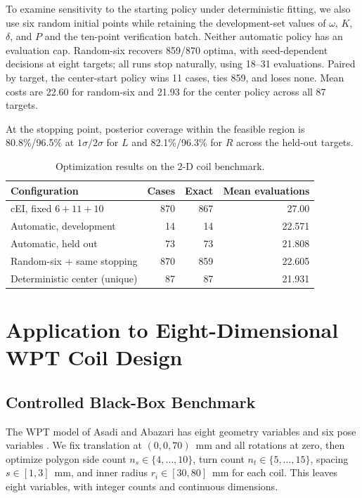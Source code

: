 \documentclass[10pt,conference,letterpaper]{IEEEtran}
\begin{document}
To examine sensitivity to the starting policy under deterministic fitting, we also use six random initial points while retaining the development-set values of $\omega$, $K$, $\delta$, and $P$ and the ten-point verification batch. Neither automatic policy has an evaluation cap. Random-six recovers 859/870 optima, with seed-dependent decisions at eight targets; all runs stop naturally, using 18--31 evaluations. Paired by target, the center-start policy wins 11 cases, ties 859, and loses none. Mean costs are 22.60 for random-six and 21.93 for the center policy across all 87 targets.


At the stopping point, posterior coverage within the feasible region is 80.8\%/96.5\% at $1\sigma/2\sigma$ for $L$ and 82.1\%/96.3\% for $R$ across the held-out targets.


\begin{table}[!t]
\caption{Optimization results on the 2-D coil benchmark.}
\label{tab:two-d}
\centering
\footnotesize
\begin{tabular}{@{}lrrr@{}}
\toprule
Configuration & Cases & Exact & Mean evaluations \\
\midrule
cEI, fixed $6+11+10$ & 870 & 867 & 27.00 \\
Automatic, development & 14 & 14 & 22.571 \\
Automatic, held out & 73 & 73 & 21.808 \\
Random-six + same stopping & 870 & 859 & 22.605 \\
Deterministic center (unique) & 87 & 87 & 21.931 \\
\bottomrule
\end{tabular}
\end{table}

\section{Application to Eight-Dimensional WPT Coil Design}
\subsection{Controlled Black-Box Benchmark}
The WPT model of Asadi and Abazari has eight geometry variables and six pose variables \cite{asadi2025}. We fix translation at $(0,0,70)$~mm and all rotations at zero, then optimize polygon side count $n_s\in\{4,\ldots,10\}$, turn count $n_t\in\{5,\ldots,15\}$, spacing $s\in[1,3]$~mm, and inner radius $r_i\in[30,80]$~mm for each coil. This leaves eight variables, with integer counts and continuous dimensions.
\end{document}
